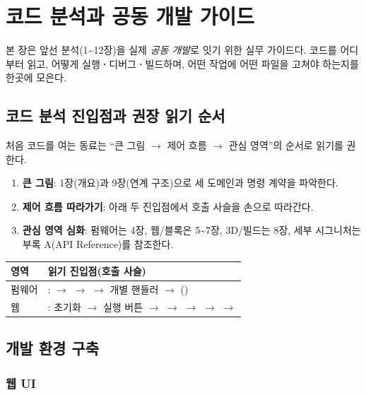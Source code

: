 \section{코드 분석과 공동 개발 가이드}

본 장은 앞선 분석(1\textasciitilde 12장)을 실제 \emph{공동 개발}로 잇기 위한
실무 가이드다. 코드를 어디부터 읽고, 어떻게 실행\textbf{·}디버그\textbf{·}빌드하며,
어떤 작업에 어떤 파일을 고쳐야 하는지를 한곳에 모은다.

\subsection{코드 분석 진입점과 권장 읽기 순서}

처음 코드를 여는 동료는 ``큰 그림 $\to$ 제어 흐름 $\to$ 관심 영역''의 순서로
읽기를 권한다.

\begin{enumerate}
  \item \textbf{큰 그림}: 1장(개요)과 9장(연계 구조)으로 세 도메인과 명령 계약을 파악한다.
  \item \textbf{제어 흐름 따라가기}: 아래 두 진입점에서 호출 사슬을 손으로 따라간다.
  \item \textbf{관심 영역 심화}: 펌웨어는 4장, 웹/블록은 5\textasciitilde 7장, 3D/빌드는 8장,
        세부 시그니처는 부록 A(API Reference)를 참조한다.
\end{enumerate}

\begin{longtable}{L{2.6cm} L{12.0cm}}
\toprule
{}\textbf{영역} & \textbf{읽기 진입점(호출 사슬)} \\
\midrule
\endhead
펌웨어 & :  $\to$  $\to$
   $\to$ 개별 핸들러 $\to$ () \\
웹 & :  초기화 $\to$ 실행 버튼 $\to$
   $\to$  $\to$
   $\to$  $\to$  \\
\bottomrule
\end{longtable}

\subsection{개발 환경 구축}

\subsubsection{웹 UI}

